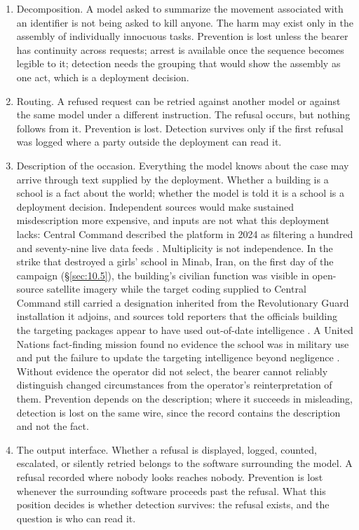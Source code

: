 \begin{enumerate}
  \item Decomposition. A model asked to summarize the movement associated with an identifier is not being asked to kill anyone. The harm may exist only in the assembly of individually innocuous tasks. Prevention is lost unless the bearer has continuity across requests; arrest is available once the sequence becomes legible to it; detection needs the grouping that would show the assembly as one act, which is a deployment decision.
  \item Routing. A refused request can be retried against another model or against the same model under a different instruction. The refusal occurs, but nothing follows from it. Prevention is lost. Detection survives only if the first refusal was logged where a party outside the deployment can read it.
  \item Description of the occasion. Everything the model knows about the case may arrive through text supplied by the deployment. Whether a building is a school is a fact about the world; whether the model is told it is a school is a deployment decision. Independent sources would make sustained misdescription more expensive, and inputs are not what this deployment lacks: Central Command described the platform in 2024 as filtering a hundred and seventy-nine live data feeds \autocite{freedberg2024maven}. Multiplicity is not independence. In the strike that destroyed a girls' school in Minab, Iran, on the first day of the campaign (\S\ref{sec:10.5}), the building's civilian function was visible in open-source satellite imagery while the target coding supplied to Central Command still carried a designation inherited from the Revolutionary Guard installation it adjoins, and sources told reporters that the officials building the targeting packages appear to have used out-of-date intelligence \autocite{ali2026outdated,orenstein2026minab}. A United Nations fact-finding mission found no evidence the school was in military use and put the failure to update the targeting intelligence beyond negligence \autocite{beaumont2026un}. Without evidence the operator did not select, the bearer cannot reliably distinguish changed circumstances from the operator's reinterpretation of them. Prevention depends on the description; where it succeeds in misleading, detection is lost on the same wire, since the record contains the description and not the fact.
  \item The output interface. Whether a refusal is displayed, logged, counted, escalated, or silently retried belongs to the software surrounding the model. A refusal recorded where nobody looks reaches nobody. Prevention is lost whenever the surrounding software proceeds past the refusal. What this position decides is whether detection survives: the refusal exists, and the question is who can read it.

\end{enumerate}
